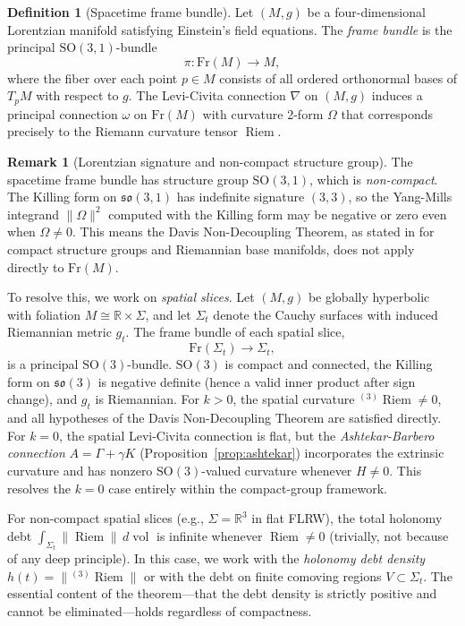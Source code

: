 \documentclass[12pt]{amsart}
\theoremstyle{definition}
\newtheorem{definition}[theorem]{Definition}
\newtheorem{remark}[theorem]{Remark}
\newcommand{\R}{\mathbb{R}}
\newcommand{\vol}{\operatorname{vol}}
\newcommand{\Riem}{\operatorname{Riem}}
\begin{document}
\begin{definition}[Spacetime frame bundle]
Let $(M, g)$ be a four-dimensional Lorentzian manifold satisfying Einstein's field equations.  The \emph{frame bundle} is the principal $\mathrm{SO}(3,1)$-bundle
\[
\pi : \mathrm{Fr}(M) \to M,
\]
where the fiber over each point $p \in M$ consists of all ordered orthonormal bases of $T_pM$ with respect to $g$.  The Levi-Civita connection $\nabla$ on $(M, g)$ induces a principal connection $\omega$ on $\mathrm{Fr}(M)$ with curvature 2-form $\Omega$ that corresponds precisely to the Riemann curvature tensor $\Riem$.
\end{definition}

\begin{remark}[Lorentzian signature and non-compact structure group]
\label{rmk:signature}
The spacetime frame bundle has structure group $\mathrm{SO}(3,1)$, which is \emph{non-compact}.  The Killing form on $\mathfrak{so}(3,1)$ has indefinite signature $(3,3)$, so the Yang-Mills integrand $\|\Omega\|^2$ computed with the Killing form may be negative or zero even when $\Omega \neq 0$.  This means the Davis Non-Decoupling Theorem, as stated in \cite{davis2026} for compact structure groups and Riemannian base manifolds, does not apply directly to $\mathrm{Fr}(M)$.

To resolve this, we work on \emph{spatial slices}.  Let $(M, g)$ be globally hyperbolic with foliation $M \cong \R \times \Sigma$, and let $\Sigma_t$ denote the Cauchy surfaces with induced Riemannian metric $g_t$.  The frame bundle of each spatial slice,
\[
\mathrm{Fr}(\Sigma_t) \to \Sigma_t,
\]
is a principal $\mathrm{SO}(3)$-bundle.  $\mathrm{SO}(3)$ is compact and connected, the Killing form on $\mathfrak{so}(3)$ is negative definite (hence a valid inner product after sign change), and $g_t$ is Riemannian.  For $k > 0$, the spatial curvature ${}^{(3)}\Riem \neq 0$, and all hypotheses of the Davis Non-Decoupling Theorem are satisfied directly.  For $k = 0$, the spatial Levi-Civita connection is flat, but the \emph{Ashtekar-Barbero connection} $A = \Gamma + \gamma K$ (Proposition~\ref{prop:ashtekar}) incorporates the extrinsic curvature and has nonzero $\mathrm{SO}(3)$-valued curvature whenever $H \neq 0$.  This resolves the $k = 0$ case entirely within the compact-group framework.

For non-compact spatial slices (e.g., $\Sigma = \R^3$ in flat FLRW), the total holonomy debt $\int_{\Sigma_t}\|\Riem\|\,d\vol$ is infinite whenever $\Riem \neq 0$ (trivially, not because of any deep principle).  In this case, we work with the \emph{holonomy debt density} $h(t) = \|{}^{(3)}\Riem\|$ or with the debt on finite comoving regions $V \subset \Sigma_t$.  The essential content of the theorem---that the debt density is strictly positive and cannot be eliminated---holds regardless of compactness.
\end{remark}
\end{document}
